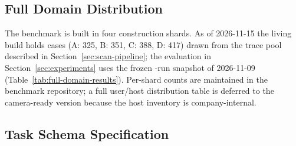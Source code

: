 \subsection{Full Domain Distribution}
\label{sec:full-distribution}

The benchmark is built in four construction shards. As of 2026-11-15 the living
build holds \Ntasks{} cases (A: 325, B: 351, C: 388, D: 417) drawn from the
trace pool described in Section~\ref{sec:scan-pipeline}; the evaluation in
Section~\ref{sec:experiments} uses the frozen \Neval{}-run snapshot of
2026-11-09 (Table~\ref{tab:full-domain-results}). Per-shard counts are maintained
in the benchmark repository; a full user/host distribution table is deferred to
the camera-ready version because the host inventory is company-internal.

\subsection{Task Schema Specification}
\label{sec:task-schema-spec}

